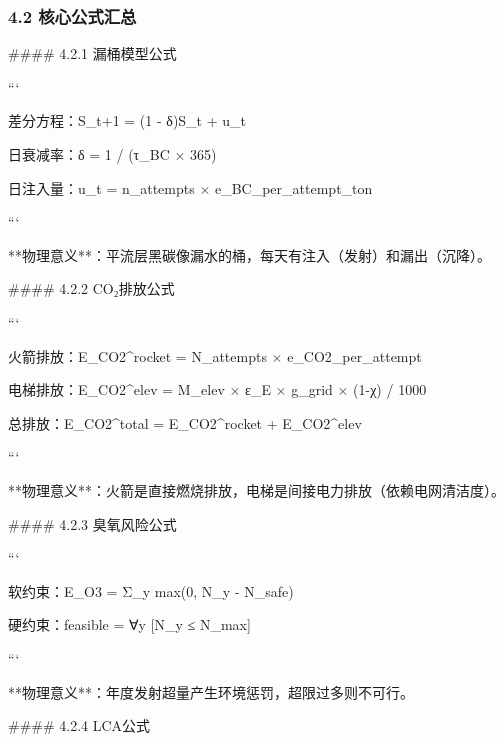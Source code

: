 \documentclass[a4paper,12pt]{article}
\begin{document}
\subsubsection{4.2 核心公式汇总}
#### 4.2.1 漏桶模型公式

\par
```

\par
差分方程：S\_{t+1} = (1 - δ)S\_t + u\_t

\par
日衰减率：δ = 1 / (τ\_{BC} × 365)

\par
日注入量：u\_t = n\_attempts × e\_BC\_per\_attempt\_ton

\par
```

\par
**物理意义**：平流层黑碳像漏水的桶，每天有注入（发射）和漏出（沉降）。

\par
#### 4.2.2 CO₂排放公式

\par
```

\par
火箭排放：E\_CO2^{rocket} = N\_attempts × e\_CO2\_per\_attempt

\par
电梯排放：E\_CO2^{elev} = M\_elev × ε\_E × g\_grid × (1-χ) / 1000

\par
总排放：E\_CO2^{total} = E\_CO2^{rocket} + E\_CO2^{elev}

\par
```

\par
**物理意义**：火箭是直接燃烧排放，电梯是间接电力排放（依赖电网清洁度）。

\par
#### 4.2.3 臭氧风险公式

\par
```

\par
软约束：E\_O3 = Σ\_y max(0, N\_y - N\_safe)

\par
硬约束：feasible = ∀y [N\_y ≤ N\_max]

\par
```

\par
**物理意义**：年度发射超量产生环境惩罚，超限过多则不可行。

\par
#### 4.2.4 LCA公式
\end{document}
